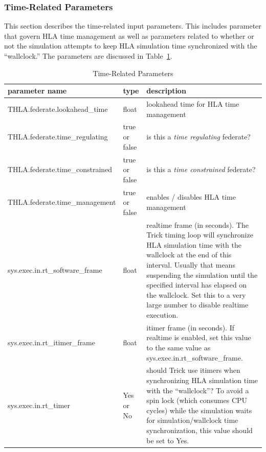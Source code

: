 \subsubsection{Time-Related Parameters}

This section describes the time-related input parameters.
This includes parameter that govern HLA time management
as well as parameters related to whether or not
the simulation attempts to keep HLA simulation time synchronized with
the ``wallclock.''
The parameters are discussed in Table~\ref{tab:time-parameters}.

\begin{table}[h]
  \scriptsize
  \begin{center}
    \begin{tabular}{|l|l|p{3.25in}|}
    \hline
    parameter name & type & description \\
    \hline \hline
      {\ttfamily THLA.federate.lookahead\_time} & float
      & lookahead time for HLA time management
      \\
      \hline
      {\ttfamily THLA.federate.time\_regulating} & true or false
      & is this a {\em time regulating} federate?
      \\
      \hline
      {\ttfamily THLA.federate.time\_constrained} & true or false
      & is this a {\em time constrained} federate?
      \\
      \hline
      {\ttfamily THLA.federate.time\_management} & true or false
      & enables / disables HLA time management
      \\
      \hline
      {\ttfamily sys.exec.in.rt\_software\_frame} & float
      & realtime frame (in seconds).
        The Trick timing loop will synchronize HLA simulation time
        with the wallclock at the end of this interval.
        Usually that means suspending the simulation until the
        specified interval has elapsed on the wallclock.
        Set this to a very large number to disable realtime execution.
      \\
      \hline
      {\ttfamily sys.exec.in.rt\_itimer\_frame} & float
      & itimer frame (in seconds).
        If realtime is enabled, set this value to the same value as
        sys.exec.in.rt\_software\_frame.
      \\
      \hline
      {\ttfamily sys.exec.in.rt\_timer} & Yes or No
      & should Trick use itimers when synchronizing HLA simulation time
        with the ``wallclock''?
        To avoid a spin lock (which consumes CPU cycles) while the
        simulation waits for simulation/wallclock time synchronization,
        this value should be set to Yes.
      \\
      \hline
    \end{tabular}
  \end{center}
  \caption{Time-Related Parameters}
  \label{tab:time-parameters}
\end{table}


